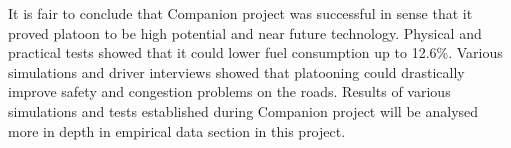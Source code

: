 % 
It is fair to conclude that Companion project was successful in sense that it proved platoon to be high potential and near future technology. Physical and practical tests showed that it could lower fuel consumption up to 12.6\%. Various simulations and driver interviews showed that platooning could drastically improve safety and congestion problems on the roads. Results of various simulations and tests established during Companion project will be analysed more in depth in empirical data section in this project.
% 